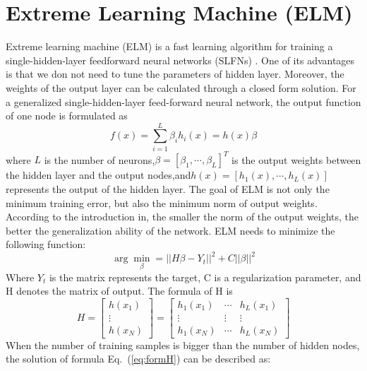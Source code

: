 \documentclass[review,numbers,sort&compress]{elsarticle}  %
\begin{document}
\section{Extreme Learning Machine (ELM)}
Extreme learning machine (ELM) is a fast learning algorithm for training a single-hidden-layer feedforward neural networks (SLFNs) \cite{huang2004extreme}\cite{huang2006extreme}\cite{huang2012extreme}. One of its advantages is that we don not need to tune the parameters of hidden layer. Moreover, the weights of the output layer can be calculated through a closed form solution.
For a generalized single-hidden-layer feed-forward neural network, the output function of one node is formulated as
\begin{equation}\label{eq:SLFNS}
  f(x)=\sum_{i=1}^{L}\beta_i h_i(x) = h(x)\beta
\end{equation}
where $L$ is the number of neurons,$\beta = [\beta_1,\cdots,\beta_L]^T$ is the output weights between the hidden layer and the output nodes,and$h(x)=[h_1(x),\cdots,h_L(x)]$ represents the output of the hidden layer.
The goal of ELM is not only the minimum training error, but also the minimum norm of output weights. According to the introduction in\cite{bartlett1998sample}, the smaller the norm of the output weights, the better the generalization ability of the network. ELM needs to minimize the following function:
\begin{equation}\label{eq:objectFunc}
  \arg\min\limits_{\beta}=||H\beta-Y_t||^2+C||\beta||^2
\end{equation}
Where $Y_t$ is the matrix represents the target, C is a regularization parameter, and H denotes the matrix of output. The formula of H is
\begin{equation}\label{eq:formH}
  H = \left[
       \begin{matrix}
         h(x_1) \\
         \vdots  \\
         h(x_N)
       \end{matrix}
       \right]
     =\left[
        \begin{matrix}
          h_1(x_1) & \cdots & h_L(x_1) \\
          \vdots & \vdots & \vdots \\
          h_1(x_N) & \cdots & h_L(x_N)
        \end{matrix}
       \right]
\end{equation}
When the number of training samples is bigger than the number of hidden nodes, the solution of formula Eq.~(\ref{eq:formH}) can be described as:
\end{document}
